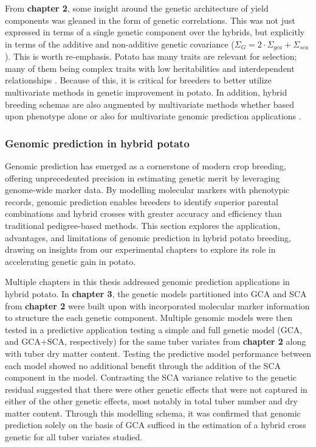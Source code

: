 \documentclass[
]{article}
\begin{document}
From \textbf{chapter 2}, some insight around the genetic architecture of
yield components was gleaned in the form of genetic correlations. This
was not just expressed in terms of a single genetic component over the
hybrids, but explicitly in terms of the additive and non-additive
genetic covariance (\(\Sigma_G = 2 \cdot \Sigma_{gca} + \Sigma_{sca}\)).
This is worth re-emphasis. Potato has many traits are relevant for
selection; many of them being complex traits with low heritabilities and
interdependent relationships \autocite{Gebhardt2013}. Because of this,
it is critical for breeders to better utilize multivariate methods in
genetic improvement in potato. In addition, hybrid breeding schemas are
also augmented by multivariate methods whether based upon phenotype
alone or also for multivariate genomic prediction applications
\autocite{Wang2017}.

\subsubsection{Genomic prediction in hybrid
potato}\label{genomic-prediction-in-hybrid-potato}

Genomic prediction has emerged as a cornerstone of modern crop breeding,
offering unprecedented precision in estimating genetic merit by
leveraging genome-wide marker data. By modelling molecular markers with
phenotypic records, genomic prediction enables breeders to identify
superior parental combinations and hybrid crosses with greater accuracy
and efficiency than traditional pedigree-based methods. This section
explores the application, advantages, and limitations of genomic
prediction in hybrid potato breeding, drawing on insights from our
experimental chapters to explore its role in accelerating genetic gain
in potato.

Multiple chapters in this thesis addressed genomic prediction
applications in hybrid potato. In \textbf{chapter 3}, the genetic models
partitioned into GCA and SCA from \textbf{chapter 2} were built upon
with incorporated molecular marker information to structure the each
genetic component. Multiple genomic models were then tested in a
predictive application testing a simple and full genetic model (GCA, and
GCA+SCA, respectively) for the same tuber variates from \textbf{chapter
2} along with tuber dry matter content. Testing the predictive model
performance between each model showed no additional benefit through the
addition of the SCA component in the model. Contrasting the SCA variance
relative to the genetic residual suggested that there were other genetic
effects that were not captured in either of the other genetic effects,
most notably in total tuber number and dry matter content. Through this
modelling schema, it was confirmed that genomic prediction solely on the
basis of GCA sufficed in the estimation of a hybrid cross genetic for
all tuber variates studied.
\end{document}
